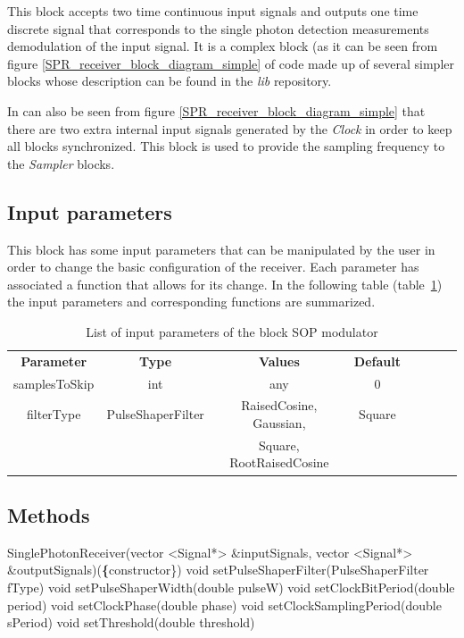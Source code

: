 This block accepts two time continuous input signals and outputs one time discrete signal that corresponds to the single photon detection measurements demodulation of the input signal. It is a complex block (as it can be seen from figure \ref{SPR_receiver_block_diagram_simple} of code made up of several simpler blocks whose description can be found in the \textit{lib} repository.

In can also be seen from figure \ref{SPR_receiver_block_diagram_simple} that there are two extra internal input signals generated by the \textit{Clock} in order to keep all blocks synchronized. This block is used to provide the sampling frequency to the \textit{Sampler} blocks.


\subsection*{Input parameters}

This block has some input parameters that can be manipulated by the user in order to change the basic configuration of the receiver. Each parameter has associated a function that allows for its change. In the following table (table~\ref{table:spr_in_par}) the input parameters and corresponding functions are summarized.

\begin{table}[h]
	\centering
	\begin{tabular}{|c|c|c|c|cccc}
		\cline{1-4}
		\textbf{Parameter} & \textbf{Type} & \textbf{Values} &   \textbf{Default}& \\ \cline{1-4}
		samplesToSkip & int & any & 0 \\ \cline{1-4}
		filterType  & PulseShaperFilter & RaisedCosine, Gaussian,  & Square \\ 
                    &                   & Square, RootRaisedCosine &        \\ \cline{1-4}
	
	\end{tabular}
	\caption{List of input parameters of the block SOP modulator}
	\label{table:spr_in_par}
\end{table}


\subsection*{Methods}

SinglePhotonReceiver(vector <Signal*> \&inputSignals, vector <Signal*> \&outputSignals)(\textbf\{constructor\})
\bigbreak
void setPulseShaperFilter(PulseShaperFilter fType)
\bigbreak
void setPulseShaperWidth(double pulseW)
\bigbreak
void setClockBitPeriod(double period)
\bigbreak
void setClockPhase(double phase)
\bigbreak
void setClockSamplingPeriod(double sPeriod)
\bigbreak
void setThreshold(double threshold)

